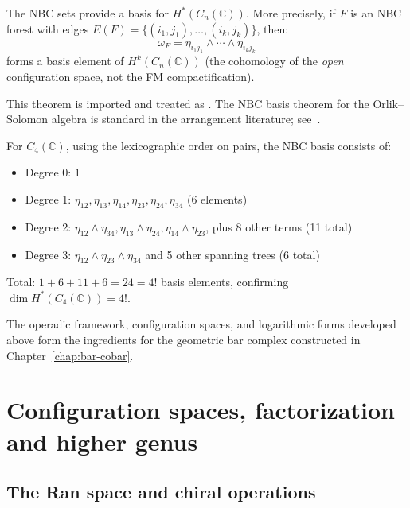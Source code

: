 \begin{theorem}\label{thm:NBC}
The NBC sets provide a basis for $H^*(C_n(\mathbb{C}))$. More precisely, if $F$ is an NBC forest with edges $E(F) = \{(i_1, j_1), \ldots, (i_k, j_k)\}$, then:
\[
\omega_F = \eta_{i_1j_1} \wedge \cdots \wedge \eta_{i_kj_k}
\]
forms a basis element of $H^k(C_n(\mathbb{C}))$
(the cohomology of the \emph{open} configuration space, not the FM compactification).
\end{theorem}

\begin{remark}
This theorem is imported and treated as \ClaimStatusProvedElsewhere. The NBC
basis theorem for the Orlik--Solomon algebra is standard in the arrangement
literature; see~\cite{OS80}.
\end{remark}
 
\begin{example}[NBC basis for \texorpdfstring{$n = 4$}{n = 4}]\label{ex:NBC4}
For $C_4(\mathbb{C})$, using the lexicographic order on pairs, the NBC basis consists of:
\begin{itemize}
\item Degree 0: $1$
\item Degree 1: $\eta_{12}, \eta_{13}, \eta_{14}, \eta_{23}, \eta_{24}, \eta_{34}$ (6 elements)
\item Degree 2: $\eta_{12} \wedge \eta_{34}, \eta_{13} \wedge \eta_{24}, \eta_{14} \wedge \eta_{23}$, plus 8 other terms (11 total)
\item Degree 3: $\eta_{12} \wedge \eta_{23} \wedge \eta_{34}$ and 5 other spanning trees (6 total)
\end{itemize}
Total: $1 + 6 + 11 + 6 = 24 = 4!$ basis elements, confirming $\dim H^*(C_4(\mathbb{C})) = 4!$.
\end{example}
 
The operadic framework, configuration spaces, and logarithmic forms
developed above form the ingredients for the geometric bar complex
constructed in Chapter~\ref{chap:bar-cobar}.
 
\section{Configuration spaces, factorization and higher genus}
 
\subsection{The Ran space and chiral operations}

